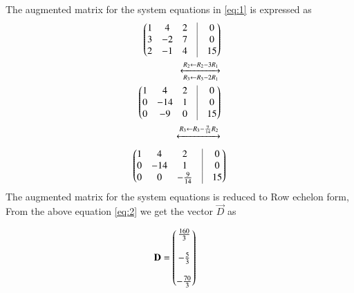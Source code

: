 \documentclass[journal,12pt,twocolumn]{IEEEtran}
\begin{document}
\begin{enumerate}
The augmented matrix for the system equations in \eqref{eq:1} is expressed as
\begin{align}
	\myvec{1&4&2&\vrule&0\\ 3&-2&7&\vrule&0 \\ 2&-1&4&\vrule&15} \\
	\xleftrightarrow[R_3\leftarrow R_3-2R_1]{R_2\leftarrow R_2-3R_1}\\
	\myvec{1&4&2&\vrule&0\\ 0&-14&1&\vrule&0 \\ 0&-9&0&\vrule&15}\\
	\xleftrightarrow[]{R_3\leftarrow R_3-\frac{9}{14}R_2}
\end{align}
\begin{align}
	\label{eq:2}
	\myvec{1&4&2&\vrule&0\\ 0&-14&1&\vrule&0 \\ 0&0&-\frac{9}{14}&\vrule&15}
\end{align}
The augmented matrix for the system equations is reduced to Row echelon form, From the above equation \ref{eq:2} we get the vector $\vec{D}$ as

\begin{align}
\mathbf{D} &= \begin{pmatrix}\frac{160}{3}\\\\ -\frac{5}{3}\\\\-\frac{70}{3}\end{pmatrix}
\end{align}

\end{enumerate}
\end{document}
